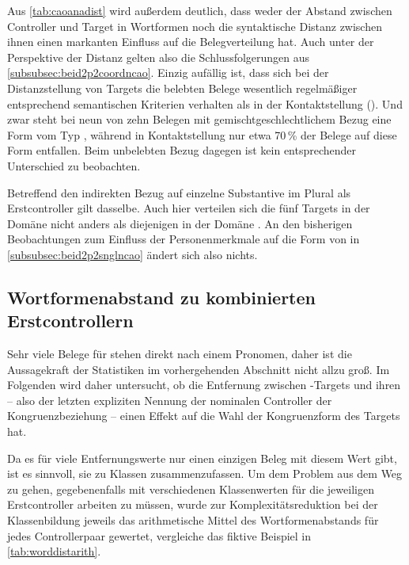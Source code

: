 Aus \cref{tab:caoanadist} wird außerdem deutlich, dass weder der Abstand
zwischen Controller und Target in Wortformen noch die syntaktische Distanz
zwischen ihnen einen markanten Einfluss auf die Belegverteilung hat. Auch unter
der Perspektive der Distanz gelten also die Schlussfolgerungen aus
\cref{subsubsec:beid2p2coordncao}. Einzig aufällig ist, dass sich bei der
Distanzstellung von Targets die belebten Belege wesentlich regelmäßiger
entsprechend semantischen Kriterien verhalten als in der Kontaktstellung
(). Und zwar steht bei neun von zehn Belegen mit
gemischtgeschlechtlichem Bezug eine Form vom Typ , während in
Kontaktstellung nur etwa 70\,\% der Belege auf diese Form entfallen. Beim
unbelebten Bezug dagegen ist kein entsprechender Unterschied zu beobachten.

Betreffend den indirekten Bezug auf einzelne Substantive im Plural als
Erstcontroller gilt dasselbe. Auch hier verteilen sich die fünf Targets in der
Domäne  nicht anders als diejenigen in der Domäne
. An den bisherigen Beobachtungen zum
Einfluss der Personenmerkmale auf die Form von  in
\cref{subsubsec:beid2p2snglncao} ändert sich also nichts.

\subsection{Wortformenabstand zu kombinierten Erstcontrollern}

Sehr viele Belege für  stehen direkt nach einem Pronomen, daher ist
die Aussagekraft der Statistiken im vorhergehenden Abschnitt nicht allzu groß.
Im Folgenden wird daher untersucht, ob die Entfernung zwischen
-Targets und ihren  -- also der letzten
expliziten Nennung der nominalen Controller der Kongruenzbeziehung -- einen
Effekt auf die Wahl der Kongruenzform des Targets hat.

Da es für viele Entfernungswerte nur einen einzigen Beleg mit diesem Wert gibt,
ist es sinnvoll, sie zu Klassen zusammenzufassen. Um dem Problem aus dem Weg zu
gehen, gegebenenfalls mit verschiedenen Klassenwerten für die jeweiligen
Erstcontroller arbeiten zu müssen, wurde zur Komplexitätsreduktion bei der
Klassenbildung jeweils das arithmetische Mittel des Wortformenabstands für
jedes Controllerpaar gewertet, vergleiche das fiktive Beispiel in
\cref{tab:worddistarith}.

